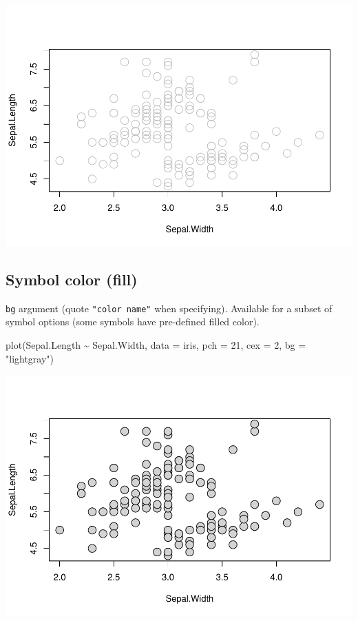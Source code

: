 \documentclass[
]{book}
\newenvironment{Shaded}{\begin{snugshade}}{\end{snugshade}}
\newcommand{\AttributeTok}[1]{\textcolor[rgb]{0.77,0.63,0.00}{#1}}
\newcommand{\DecValTok}[1]{\textcolor[rgb]{0.00,0.00,0.81}{#1}}
\newcommand{\FunctionTok}[1]{\textcolor[rgb]{0.00,0.00,0.00}{#1}}
\newcommand{\NormalTok}[1]{#1}
\newcommand{\SpecialCharTok}[1]{\textcolor[rgb]{0.00,0.00,0.00}{#1}}
\newcommand{\StringTok}[1]{\textcolor[rgb]{0.31,0.60,0.02}{#1}}
\begin{document}
\begin{center}\includegraphics{_main_files/figure-latex/unnamed-chunk-119-1} \end{center}

\hypertarget{symbol-color-fill}{%
\subsection{Symbol color (fill)}\label{symbol-color-fill}}

\texttt{bg} argument (quote \texttt{"color\ name"} when specifying). Available for a subset of symbol options (some symbols have pre-defined filled color).

\begin{Shaded}
\begin{Highlighting}[]
\FunctionTok{plot}\NormalTok{(Sepal.Length }\SpecialCharTok{\textasciitilde{}}\NormalTok{ Sepal.Width, }\AttributeTok{data =}\NormalTok{ iris,}
     \AttributeTok{pch =} \DecValTok{21}\NormalTok{, }\AttributeTok{cex =} \DecValTok{2}\NormalTok{, }\AttributeTok{bg =} \StringTok{"lightgray"}\NormalTok{)}
\end{Highlighting}
\end{Shaded}

\begin{center}\includegraphics{_main_files/figure-latex/unnamed-chunk-120-1} \end{center}
\end{document}
